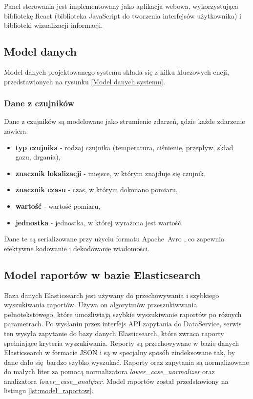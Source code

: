 \vspace{0.3em}

Panel sterowania jest implementowany jako aplikacja webowa, wykorzystująca bibliotekę React (biblioteka JavaScript do tworzenia interfejsów użytkownika) i biblioteki wizualizacji informacji.

\subsection{Model danych}
\label{subsec:model_danych}

Model danych projektowanego systemu składa się z kilku kluczowych encji, przedstawionych na rysunku \ref{Model danych systemu}.


\subsubsection{Dane z czujników}
\label{subsubsec:dane_czujnikow}

Dane z czujników są modelowane jako strumienie zdarzeń, gdzie każde zdarzenie zawiera:

\begin{itemize}
    \item \textbf{typ czujnika} - rodzaj czujnika (temperatura, ciśnienie, przepływ, skład gazu, drgania),
    \item \textbf{znacznik lokalizacji} - miejsce, w którym znajduje się czujnik,
    \item \textbf{znacznik czasu} - czas, w którym dokonano pomiaru,
    \item \textbf{wartość} - wartość pomiaru,
    \item \textbf{jednostka} - jednostka, w której wyrażona jest wartość.
\end{itemize}

\vspace{0.3em}

Dane te są serializowane przy użyciu formatu \mbox{Apache Avro} \cite{avro_documentation}, co zapewnia efektywne kodowanie i dekodowanie wiadomości.

\subsection{Model raportów w bazie Elasticsearch}
\label{subsec:model_raportow}

Baza danych Elasticsearch jest używany do przechowywania i szybkiego wyszukiwania raportów. Używa on algorytmów przeszukiwwania pełnotekstowego, które umożliwiają szybkie wyszukiwanie raportów po różnych parametrach. Po wysłaniu przez interfejs API zapytania do DataService, serwis ten wysyła zapytanie do bazy danych Elasticsearch, które zwraca raporty spełniające kryteria wyszukiwania. Reporty są przechowywane w bazie danych Elasticsearch w formacie JSON i są w specjalny sposób zindeksowane tak, by dane dało się bardzo szybko wyszukać. Raporty oraz zapytania są normalizowane do małych liter za pomocą normalizatora \textit{lower\_case\_normalizer} oraz analizatora \textit{lower\_case\_analyzer}. Model raportów został przedstawiony na listingu \ref{lst:model_raportow}.

